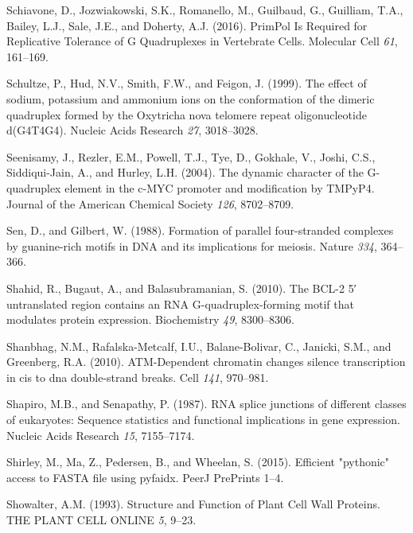 \documentclass[12pt,a4paper,]{report}
\begin{document}
\leavevmode\hypertarget{ref-Schiavone2016}{}%
Schiavone, D., Jozwiakowski, S.K., Romanello, M., Guilbaud, G.,
Guilliam, T.A., Bailey, L.J., Sale, J.E., and Doherty, A.J. (2016).
PrimPol Is Required for Replicative Tolerance of G Quadruplexes in
Vertebrate Cells. Molecular Cell \emph{61}, 161--169.

\leavevmode\hypertarget{ref-Schultze1999}{}%
Schultze, P., Hud, N.V., Smith, F.W., and Feigon, J. (1999). The effect
of sodium, potassium and ammonium ions on the conformation of the
dimeric quadruplex formed by the Oxytricha nova telomere repeat
oligonucleotide d(G4T4G4). Nucleic Acids Research \emph{27}, 3018--3028.

\leavevmode\hypertarget{ref-Seenisamy2004}{}%
Seenisamy, J., Rezler, E.M., Powell, T.J., Tye, D., Gokhale, V., Joshi,
C.S., Siddiqui-Jain, A., and Hurley, L.H. (2004). The dynamic character
of the G-quadruplex element in the c-MYC promoter and modification by
TMPyP4. Journal of the American Chemical Society \emph{126}, 8702--8709.

\leavevmode\hypertarget{ref-Sen1988}{}%
Sen, D., and Gilbert, W. (1988). Formation of parallel four-stranded
complexes by guanine-rich motifs in DNA and its implications for
meiosis. Nature \emph{334}, 364--366.

\leavevmode\hypertarget{ref-Shahid2010}{}%
Shahid, R., Bugaut, A., and Balasubramanian, S. (2010). The BCL-2 5′
untranslated region contains an RNA G-quadruplex-forming motif that
modulates protein expression. Biochemistry \emph{49}, 8300--8306.

\leavevmode\hypertarget{ref-Shanbhag2010}{}%
Shanbhag, N.M., Rafalska-Metcalf, I.U., Balane-Bolivar, C., Janicki,
S.M., and Greenberg, R.A. (2010). ATM-Dependent chromatin changes
silence transcription in cis to dna double-strand breaks. Cell
\emph{141}, 970--981.

\leavevmode\hypertarget{ref-Shapiro1987}{}%
Shapiro, M.B., and Senapathy, P. (1987). RNA splice junctions of
different classes of eukaryotes: Sequence statistics and functional
implications in gene expression. Nucleic Acids Research \emph{15},
7155--7174.

\leavevmode\hypertarget{ref-Shirley2015}{}%
Shirley, M., Ma, Z., Pedersen, B., and Wheelan, S. (2015). Efficient
"pythonic" access to FASTA file using pyfaidx. PeerJ PrePrints 1--4.

\leavevmode\hypertarget{ref-Showalter1993}{}%
Showalter, A.M. (1993). Structure and Function of Plant Cell Wall
Proteins. THE PLANT CELL ONLINE \emph{5}, 9--23.
\end{document}
